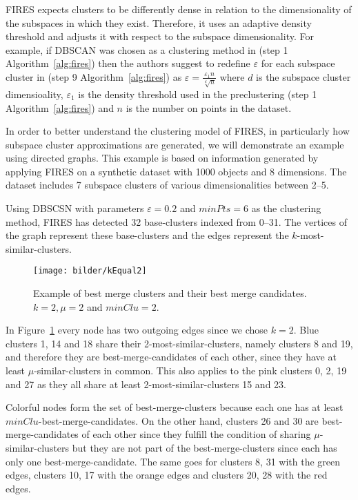 FIRES expects clusters to be differently dense in relation to the dimensionality of the subspaces in which they exist. Therefore, it uses an adaptive density threshold and adjusts it with respect to the subspace dimensionality. For example, if DBSCAN was chosen as a clustering method in (step 1 Algorithm~\ref{alg:fires}) then the authors suggest to redefine $\varepsilon$ for each subspace cluster in (step 9 Algorithm~\ref{alg:fires}) as $\varepsilon =  \frac{\varepsilon_{1}n}{\sqrt[d]{n}}$ where $d$ is the subspace cluster dimensioality, $\varepsilon_{1}$ is the density threshold used in the preclustering (step 1 Algorithm~\ref{alg:fires}) and $n$ is the number on points in the dataset.

In order to better understand the clustering model of FIRES, in particularly how subspace cluster approximations are generated, we will demonstrate an example using directed graphs. This example is based on information generated by applying FIRES on a synthetic dataset with 1000 objects and 8 dimensions. The dataset includes 7 subspace clusters of various dimensionalities between 2--5.

Using DBSCSN with parameters $\varepsilon = 0.2$ and $minPts = 6$ as the clustering method, FIRES has detected 32 base-clusters indexed from 0--31. The vertices of the graph represent these base-clusters and the edges represent the $k$-most-similar-clusters.
\begin{figure}[h]
	\centering
	\texttt{[image: bilder/kEqual2]}
	\caption{Example of best merge clusters and their best merge candidates. $k = 2, \mu = 2$ and $minClu = 2.$}
	\label{fig:kEqual2}
\end{figure}

In Figure~\ref{fig:kEqual2} every node has two outgoing edges since we chose $k = 2$. Blue clusters 1, 14 and 18 share their 2-most-similar-clusters, namely clusters 8 and 19, and therefore they are best-merge-candidates of each other, since they have at least $\mu$-similar-clusters in common. This also applies to the pink clusters 0, 2, 19 and 27 as they all share at least 2-most-similar-clusters 15 and 23.

Colorful nodes form the set of best-merge-clusters because each one has at least $minClu$-best-merge-candidates. On the other hand, clusters 26 and 30 are best-merge-candidates of each other since they fulfill the condition of sharing $\mu$-similar-clusters but they are not part of the best-merge-clusters since each has only one best-merge-candidate. The same goes for clusters 8, 31 with the green edges, clusters 10, 17 with the orange edges and clusters 20, 28 with the red edges.

